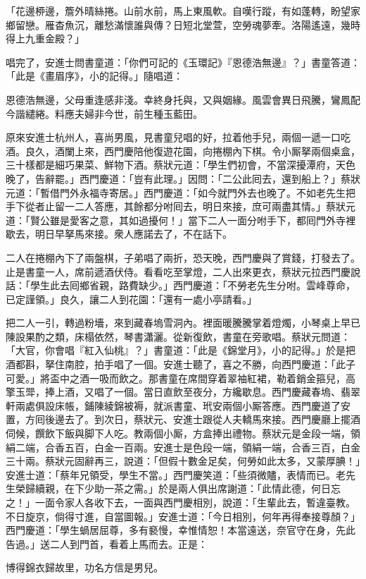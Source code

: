 \begin{myquote} 
「花邊桺邊，簷外晴絲捲。山前水前，馬上東風軟。自嘆行蹤，有如蓬轉，盼望家鄉留戀。雁杳魚沉，離愁滿懷誰與傳？日短北堂萱，空勞魂夢牽。洛陽遙遠，幾時得上九重金殿？」
\end{myquote} 

唱完了，安進士問書童道：「你們可記的《玉環記》『恩德浩無邊』？」書童答道：「此是《畫眉序》，小的記得。」隨唱道：

\begin{myquote}
恩德浩無邊，父母重逢感非淺。幸終身托與，又與姻緣。風雲會異日飛騰，鸞鳳配今諧繾綣。料應夫婦非今世，前生種玉藍田。
\end{myquote}

原來安進士杭州人，喜尚男風，見書童兒唱的好，拉着他手兒，兩個一遞一口吃酒。良久，酒闌上來，西門慶陪他復遊花園，向捲棚內下棋。令小厮拏兩個桌盒，三十樣都是細巧果菜、鮮物下酒。蔡狀元道：「學生們初會，不當深擾潭府，天色晚了，告辭罷。」西門慶道：「豈有此理。」因問：「二公此囘去，還到船上？」蔡狀元道：「暫借門外永福寺寄居。」西門慶道：「如今就門外去也晚了。不如老先生把手下從者止留一二人答應，其餘都分咐囘去，明日來接，庶可兩盡其情。」蔡狀元道：「賢公雖是愛客之意，其如過擾何！」當下二人一面分咐手下，都囘門外寺裡歇去，明日早拏馬來接。衆人應諾去了，不在話下。

二人在捲棚內下了兩盤棋，子弟唱了兩折，恐天晚，西門慶與了賞錢，打發去了。止是書童一人，席前遞酒伏侍。看看吃至掌燈，二人出來更衣，蔡狀元拉西門慶說話：「學生此去囘鄉省親，路費缺少。」西門慶道：「不勞老先生分咐。雲峰尊命，已定謹領。」良久，讓二人到花園：「還有一處小亭請看。」

把二人一引，轉過粉墻，來到藏春塢雪洞內。裡面暖騰騰掌着燈燭，小琴桌上早已陳設果酌之類，床榻依然，琴書瀟灑。從新復飲，書童在旁歌唱。蔡狀元問道：「大官，你會唱『紅入仙桃』？」書童道：「此是《錦堂月》，小的記得。」於是把酒都斟，拏住南腔，拍手唱了一個。安進士聽了，喜之不勝，向西門慶道：「此子可愛。」將盃中之酒一吸而飲之。那書童在席間穿着翠袖紅裙，勒着銷金箍兒，高擎玉斝，捧上酒，又唱了一個。當日直飲至夜分，方纔歇息。西門慶藏春塢、翡翠軒兩處俱設床帳，鋪陳綾錦被褥，就派書童、玳安兩個小厮答應。西門慶道了安置，方囘後邊去了。到次日，蔡狀元、安進士跟從人夫轎馬來接。西門慶廳上擺酒伺候，饌飲下飯與脚下人吃。教兩個小厮，方盒捧出禮物。蔡狀元是金段一端，領絹二端，合香五百，白金一百兩。安進士是色段一端，領絹一端，合香三百，白金三十兩。蔡狀元固辭再三，說道：「但假十數金足矣，何勞如此太多，又蒙厚腆！」安進士道：「蔡年兄領受，學生不當。」西門慶笑道：「些須微贐，表情而已。老先生榮歸續親，在下少助一茶之需。」於是兩人俱出席謝道：「此情此德，何日忘之！」一面令家人各收下去，一面與西門慶相別，說道：「生輩此去，暫違臺教。不日旋京，倘得寸進，自當圖報。」安進士道：「今日相別，何年再得奉接尊顏？」西門慶道：「學生蝸居屈尊，多有褻慢，幸惟情恕！本當遠送，奈官守在身，先此告過。」送二人到門首，看着上馬而去。正是：

\begin{myquote}
博得錦衣歸故里，功名方信是男兒。
\end{myquote}

